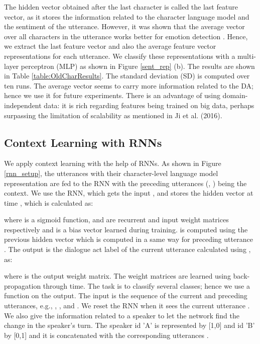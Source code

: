 \documentclass[10pt, a4paper]{article}
\begin{document}
The hidden vector  obtained after the last character is called the last feature vector, as it stores the information related to the character language model and the sentiment of the utterance. 
However, it was shown that the average vector over all characters in the utterance works better for emotion detection \cite{labothe2017WASSA2017}.
Hence, we extract the last feature vector and also the average feature vector representations for each utterance. 
We classify these representations with a multi-layer perceptron (MLP) as shown in Figure \ref{sent_rep} (b).
The results are shown in Table \ref{table:OldCharResults}. 
The standard deviation (SD) is computed over ten runs.
The average vector seems to carry more information related to the DA; hence we use it for future experiments. 
There is an advantage of using domain-independent data: it is rich regarding features being trained on big data, perhaps surpassing the limitation of scalability as mentioned in Ji et al. (2016). 


\subsection{Context Learning with RNNs}

We apply context learning with the help of RNNs. 
As shown in Figure \ref{rnn_setup}, the utterances with their character-level 
language model representation  are fed to the RNN with the preceding utterances (, ) being the context.
We use the RNN, which gets the input , and stores the hidden vector  at time  \cite{elman1990finding}, which is calculated as:
 
where  is a sigmoid function,  and  are recurrent and input weight matrices respectively and  is a bias vector learned during training. 
 is computed using the previous hidden vector  which is computed in a same way for preceding utterance .
The output  is the dialogue act label of the current utterance  calculated using , as:

where  is the output weight matrix. 
The weight matrices are learned using back-propagation through time. 
The task is to classify several classes; hence we use a  function  on the output. 
The input is the sequence of the current and preceding utterances, e.g., , , and . 
We reset the RNN when it sees the current utterance . 
We also give the information related to a speaker to let the network find the change in the speaker's turn.
The speaker id 'A' is represented by [1,0] and id 'B' by [0,1] and it is concatenated with the corresponding utterances .
\end{document}
